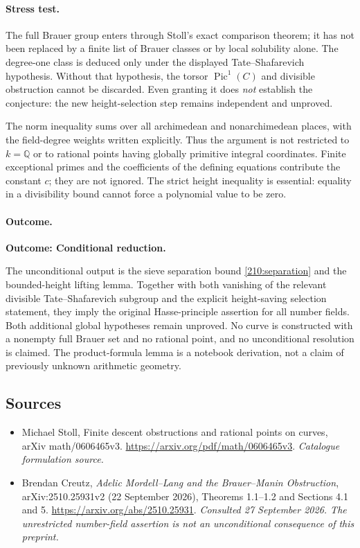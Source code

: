 \documentclass[11pt,a4paper]{article}
\newcommand{\Q}{\mathbb{Q}}
\begin{document}
\paragraph{Stress test.}
The full Brauer group enters through Stoll's exact comparison theorem;
it has not been replaced by a finite list of Brauer classes or by local
solubility alone. The degree-one class is deduced only under the displayed
Tate--Shafarevich hypothesis. Without that hypothesis, the torsor
$\operatorname{Pic}^1(C)$ and divisible obstruction cannot be discarded.
Even granting it does \emph{not} establish the conjecture: the new
height-selection step remains independent and unproved.

The norm inequality sums over all archimedean and nonarchimedean places,
with the field-degree weights written explicitly. Thus the argument is
not restricted to $k=\Q$ or to rational points having globally primitive
integral coordinates. Finite exceptional primes and the coefficients of
the defining equations contribute the constant $c$; they are not ignored.
The strict height inequality is essential: equality in a divisibility
bound cannot force a polynomial value to be zero.

\paragraph{Outcome.}
\textbf{Outcome: Conditional reduction.}

The unconditional output is the sieve separation bound
\eqref{210:separation} and the bounded-height lifting lemma. Together with
both vanishing of the relevant divisible Tate--Shafarevich subgroup and
the explicit height-saving selection statement, they imply the original
Hasse-principle assertion for all number fields. Both additional global
hypotheses remain unproved. No curve is constructed with a nonempty full
Brauer set and no rational point, and no unconditional resolution is
claimed. The product-formula lemma is a notebook derivation, not a claim
of previously unknown arithmetic geometry.
\subsection{Sources}
\begin{itemize}\raggedright
\item[\textnormal{[S1]}]\hypertarget{source:210:1}{} Michael Stoll, Finite descent obstructions and rational points on curves, arXiv math/0606465v3.
\url{https://arxiv.org/pdf/math/0606465v3}.
{\small\textit{Catalogue formulation source.}}
\item[\textnormal{[E1]}]\hypertarget{extra:210:1}{} Brendan Creutz,
\emph{Adelic Mordell--Lang and the Brauer--Manin Obstruction},
arXiv:2510.25931v2 (22 September 2026), Theorems 1.1--1.2 and Sections 4.1 and 5.
\url{https://arxiv.org/abs/2510.25931}.
{\small\textit{Consulted 27 September 2026. The unrestricted number-field assertion is not an unconditional consequence of this preprint.}}
\end{itemize}
\end{document}
